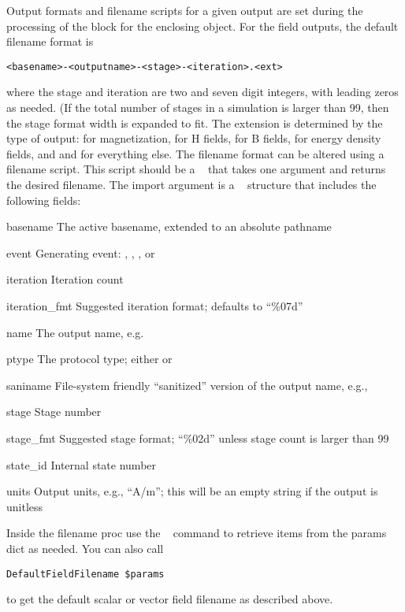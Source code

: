 \begin{description}
Output formats and filename scripts for a given output are set during
the processing of the  block for the enclosing 
object. For the field outputs, the default filename format is
\begin{verbatim}
<basename>-<outputname>-<stage>-<iteration>.<ext>
\end{verbatim}
where the stage and iteration are two and seven digit integers, with
leading zeros as needed. (If the total number of stages in a simulation
is larger than 99, then the stage format width is expanded to fit.  The
extension is determined by the type of output:  for
magnetization,  for H fields,  for B fields, 
for energy density fields, and and  for everything else. The
filename format can be altered using a filename script. This script
should be a \Tcl\  that takes one argument and returns the
desired filename. The import argument is a \Tcl\  structure
that includes the following fields:
{
\begin{rightdesc}\raggedright
\item[basename] The active  basename, extended to an
absolute pathname
\item[event] Generating event: , , ,
or 
\item[iteration] Iteration count
\item[iteration\_fmt] Suggested iteration format; defaults to ``\%07d''
\item[name] The output name, e.g. 
\item[ptype] The protocol type; either  or 
\item[saniname] File-system friendly ``sanitized'' version of the output
name, e.g., 
\item[stage] Stage number
\item[stage\_fmt] Suggested stage format; ``\%02d'' unless stage count
is larger than 99
\item[state\_id] Internal state number
\item[units] Output units, e.g., ``A/m''; this will be an empty string
if the output is unitless
\end{rightdesc}}
Inside the filename proc use the \Tcl\  command to retrieve
items from the params dict as needed. You can also call
\begin{verbatim}
DefaultFieldFilename $params
\end{verbatim}
to get the default scalar or vector field filename as described above.


\end{description}
